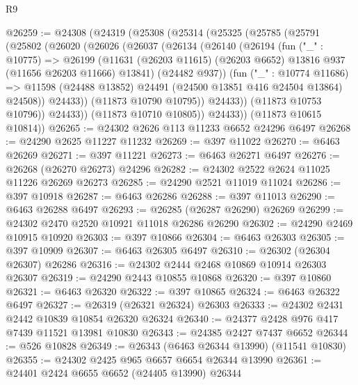 \begin{lexlean}{R9}
\begin{coremodule}
@26259 := @24308
    (@24319
      (@25308
        (@25314
          (@25325
            (@25785
              (@25791
                (@25802
                  (@26020
                    (@26026
                      (@26037
                        (@26134
                          (@26140
                            (@26194
                              (fun ("_" : @10775) =>
                              @26199
                                (@11631
                                  (@26203 @11615)
                                  (@26203 @6652)
                                  @13816
                                  @937
                                  (@11656 @26203 @11666)
                                  @13841)
                                (@24482 @937))
                              (fun ("_" : @10774 @11686) =>
                              @11598
                                (@24488 @13852)
                                @24491
                                (@24500 @13851 @416 @24504 @13864)
                                @24508))
                            @24433))
                        (@11873 @10790 @10795))
                      @24433))
                  (@11873 @10753 @10796))
                @24433))
            (@11873 @10710 @10805))
          @24433))
      (@11873 @10615 @10814))
@26265 := @24302 @2626 @113 @11233 @6652 @24296 @6497
@26268 := @24290 @2625 @11227 @11232
@26269 := @397 @11022
@26270 := @6463 @26269
@26271 := @397 @11221
@26273 := @6463 @26271 @6497
@26276 := @26268 (@26270 @26273) @24296
@26282 := @24302 @2522 @2624 @11025 @11226 @26269 @26273
@26285 := @24290 @2521 @11019 @11024
@26286 := @397 @10918
@26287 := @6463 @26286
@26288 := @397 @11013
@26290 := @6463 @26288 @6497
@26293 := @26285 (@26287 @26290) @26269
@26299 := @24302 @2470 @2520 @10921 @11018 @26286 @26290
@26302 := @24290 @2469 @10915 @10920
@26303 := @397 @10866
@26304 := @6463 @26303
@26305 := @397 @10909
@26307 := @6463 @26305 @6497
@26310 := @26302 (@26304 @26307) @26286
@26316 := @24302 @2444 @2468 @10869 @10914 @26303 @26307
@26319 := @24290 @2443 @10855 @10868
@26320 := @397 @10860
@26321 := @6463 @26320
@26322 := @397 @10865
@26324 := @6463 @26322 @6497
@26327 := @26319 (@26321 @26324) @26303
@26333 := @24302 @2431 @2442 @10839 @10854 @26320 @26324
@26340 := @24377 @2428 @976 @417 @7439 @11521 @13981 @10830
@26343 := @24385 @2427 @7437 @6652
@26344 := @526 @10828
@26349 := @26343 (@6463 @26344 @13990) (@11541 @10830)
@26355 := @24302 @2425 @965 @6657 @6654 @26344 @13990
@26361 := @24401 @2424 @6655 @6652 (@24405 @13990) @26344

\end{coremodule}
\end{lexlean}
